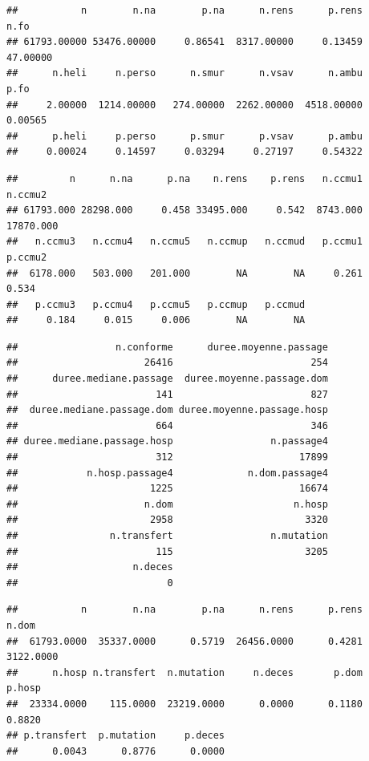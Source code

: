 \documentclass[]{article}
\begin{document}
\begin{verbatim}
##           n        n.na        p.na      n.rens      p.rens        n.fo 
## 61793.00000 53476.00000     0.86541  8317.00000     0.13459    47.00000 
##      n.heli     n.perso      n.smur      n.vsav      n.ambu        p.fo 
##     2.00000  1214.00000   274.00000  2262.00000  4518.00000     0.00565 
##      p.heli     p.perso      p.smur      p.vsav      p.ambu 
##     0.00024     0.14597     0.03294     0.27197     0.54322
\end{verbatim}

\begin{verbatim}
##         n      n.na      p.na    n.rens    p.rens   n.ccmu1   n.ccmu2 
## 61793.000 28298.000     0.458 33495.000     0.542  8743.000 17870.000 
##   n.ccmu3   n.ccmu4   n.ccmu5   n.ccmup   n.ccmud   p.ccmu1   p.ccmu2 
##  6178.000   503.000   201.000        NA        NA     0.261     0.534 
##   p.ccmu3   p.ccmu4   p.ccmu5   p.ccmup   p.ccmud 
##     0.184     0.015     0.006        NA        NA
\end{verbatim}

\begin{verbatim}
##                 n.conforme      duree.moyenne.passage 
##                      26416                        254 
##      duree.mediane.passage  duree.moyenne.passage.dom 
##                        141                        827 
##  duree.mediane.passage.dom duree.moyenne.passage.hosp 
##                        664                        346 
## duree.mediane.passage.hosp                 n.passage4 
##                        312                      17899 
##            n.hosp.passage4             n.dom.passage4 
##                       1225                      16674 
##                      n.dom                     n.hosp 
##                       2958                       3320 
##                n.transfert                 n.mutation 
##                        115                       3205 
##                    n.deces 
##                          0
\end{verbatim}

\begin{verbatim}
##           n        n.na        p.na      n.rens      p.rens       n.dom 
##  61793.0000  35337.0000      0.5719  26456.0000      0.4281   3122.0000 
##      n.hosp n.transfert  n.mutation     n.deces       p.dom      p.hosp 
##  23334.0000    115.0000  23219.0000      0.0000      0.1180      0.8820 
## p.transfert  p.mutation     p.deces 
##      0.0043      0.8776      0.0000
\end{verbatim}
\end{document}
